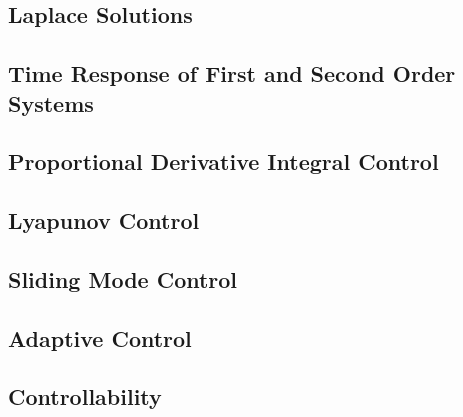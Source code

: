\subsection{Laplace Solutions}

\subsection{Time Response of First and Second Order Systems}

\subsection{Proportional Derivative Integral Control}

\subsection{Lyapunov Control}

\subsection{Sliding Mode Control}

\subsection{Adaptive Control}

\subsection{Controllability}

